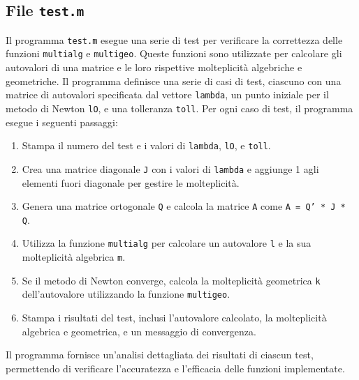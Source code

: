 \documentclass[12pt]{article}
\begin{document}
    \subsection{File \texttt{test.m}}
    Il programma \texttt{test.m} esegue una serie di test per verificare la correttezza delle funzioni \texttt{multialg} e \texttt{multigeo}. Queste funzioni sono utilizzate per calcolare gli autovalori di una matrice e le loro rispettive molteplicità algebriche e geometriche.
    Il programma definisce una serie di casi di test, ciascuno con una matrice di autovalori specificata dal vettore \texttt{lambda}, un punto iniziale per il metodo di Newton \texttt{lO}, e una tolleranza \texttt{toll}. Per ogni caso di test, il programma esegue i seguenti passaggi:
    \begin{enumerate}
        \item Stampa il numero del test e i valori di \texttt{lambda}, \texttt{lO}, e \texttt{toll}.
        \item Crea una matrice diagonale \texttt{J} con i valori di \texttt{lambda} e aggiunge 1 agli elementi fuori diagonale per gestire le molteplicità.
        \item Genera una matrice ortogonale \texttt{Q} e calcola la matrice \texttt{A} come \texttt{A = Q' * J * Q}.
        \item Utilizza la funzione \texttt{multialg} per calcolare un autovalore \texttt{l} e la sua molteplicità algebrica \texttt{m}.
        \item Se il metodo di Newton converge, calcola la molteplicità geometrica \texttt{k} dell'autovalore utilizzando la funzione \texttt{multigeo}.
        \item Stampa i risultati del test, inclusi l'autovalore calcolato, la molteplicità algebrica e geometrica, e un messaggio di convergenza.
    \end{enumerate}
    Il programma fornisce un'analisi dettagliata dei risultati di ciascun test, permettendo di verificare l'accuratezza e l'efficacia delle funzioni implementate.
\end{document}
